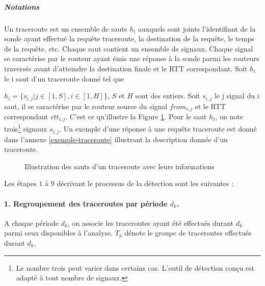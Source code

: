 \subparagraph{Notations} Un traceroute  est un ensemble de sauts $h_i$ auxquels sont joints l'identifiant de la sonde ayant effectué la requête traceroute,  la destination de la requête, le temps de la requête, etc. Chaque saut contient un ensemble de signaux. Chaque signal se caractérise par le routeur ayant émis une réponse à la sonde parmi les routeurs traversés avant d'atteindre la destination finale et le RTT correspondant. 
Soit  $h_i$ le i saut d'un traceroute donné tel que

 $h_i =\{s_{i,j} |  j \in [1, S], i\in [1,H]  \}$, $S$ et $H$ sont des entiers. Soit $ s_{i,j} $  le j signal du i saut, il se caractérise par le routeur  source du signal $from_{i,j}$ et le RTT correspondant  $rtt_{i,j}$. C'est ce qu'illustre  la Figure \ref{fig:traceroute}.
 Pour le saut $h_i$, on note trois\footnote{Le nombre trois peut varier dans certains cas. L'outil de détection conçu est adapté à tout nombre de signaux.} 
 signaux $s_{i, j}$.  Un exemple d'une réponse à une requête traceroute est donné dans l'annexe  \ref{exemple-traceroute} illustrant la description donnée d'un traceroute.
 

\begin{figure}[H]
	\centering
	\captionsetup{justification=centering}
	\resizebox{\textwidth}{!}{
		
	}
	\caption{Illustration des sauts d'un traceroute avec leurs informations}
	\label{fig:traceroute}
\end{figure}


Les étapes $ 1$ à $9$ décrivant le processus de la détection sont les suivantes : 

\paragraph{1. Regroupement des traceroutes  par période $d_k$.} A chaque période $d_k$, on associe les traceroutes ayant été effectués durant $d_k$  parmi ceux disponibles à l'analyse.   $T_k$ dénote  le groupe de traceroutes effectués durant $d_k$.


